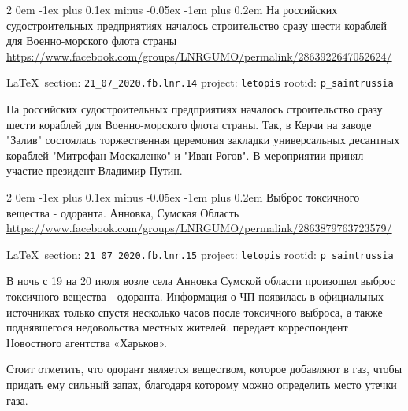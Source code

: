 \documentclass[a4paper,11pt]{extreport}
\makeatletter
\renewcommand\subsection{%
  \clearpage
    \@startsection{subsection}%
    {2}%
    {0em}%
    {-1ex plus 0.1ex minus -0.05ex}%
    {-1em plus 0.2em}%
    {\scshape\bfseries\Large}%
}
\makeatother
\begin{document}
 
\subsection{На российских судостроительных предприятиях началось строительство сразу шести кораблей для Военно-морского флота страны}
\label{sec:21_07_2020.fb.lnr.14}
\url{https://www.facebook.com/groups/LNRGUMO/permalink/2863922647052624/}
  
\vspace{0.5cm}
{\small\LaTeX~section: \verb|21_07_2020.fb.lnr.14| project: \verb|letopis| rootid: \verb|p_saintrussia|}
\vspace{0.5cm}

На российских судостроительных предприятиях началось строительство сразу шести
кораблей для Военно-морского флота страны. Так, в Керчи на заводе "Залив"
состоялась торжественная церемония закладки универсальных десантных кораблей
"Митрофан Москаленко" и "Иван Рогов". В мероприятии принял участие президент
Владимир Путин.
  
 
 
\subsection{Выброс токсичного вещества - одоранта. Анновка, Сумская Область}
\label{sec:21_07_2020.fb.lnr.15}
\url{https://www.facebook.com/groups/LNRGUMO/permalink/2863879763723579/}
  
\vspace{0.5cm}
{\small\LaTeX~section: \verb|21_07_2020.fb.lnr.15| project: \verb|letopis| rootid: \verb|p_saintrussia|}
\vspace{0.5cm}

В ночь с 19 на 20 июля возле села Анновка Сумской области произошел выброс
токсичного вещества - одоранта. Информация о ЧП появилась в официальных
источниках только спустя несколько часов после токсичного выброса, а также
поднявшегося недовольства местных жителей. передает корреспондент Новостного
агентства «Харьков».  

Стоит отметить, что одорант является веществом, которое
добавляют в газ, чтобы придать ему сильный запах, благодаря которому можно
определить место утечки газа.
\end{document}
